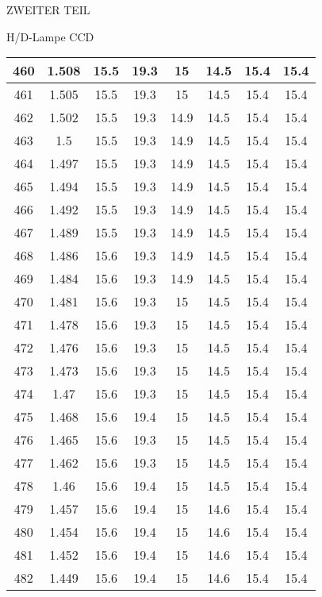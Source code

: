 \begin{appendix}
\begin{chapter}{ZWEITER TEIL}
\begin{section}{H/D-Lampe CCD}
\begin{scriptsize}
\begin{longtable}[htbp]{|c|c|c|c|c|c|c|c|}
            460 & 1.508 & 15.5 & 19.3 & 15 & 14.5 & 15.4 & 15.4 \\ \hline
            461 & 1.505 & 15.5 & 19.3 & 15 & 14.5 & 15.4 & 15.4 \\ \hline
            462 & 1.502 & 15.5 & 19.3 & 14.9 & 14.5 & 15.4 & 15.4 \\ \hline
            463 & 1.5 & 15.5 & 19.3 & 14.9 & 14.5 & 15.4 & 15.4 \\ \hline
            464 & 1.497 & 15.5 & 19.3 & 14.9 & 14.5 & 15.4 & 15.4 \\ \hline
            465 & 1.494 & 15.5 & 19.3 & 14.9 & 14.5 & 15.4 & 15.4 \\ \hline
            466 & 1.492 & 15.5 & 19.3 & 14.9 & 14.5 & 15.4 & 15.4 \\ \hline
            467 & 1.489 & 15.5 & 19.3 & 14.9 & 14.5 & 15.4 & 15.4 \\ \hline
            468 & 1.486 & 15.6 & 19.3 & 14.9 & 14.5 & 15.4 & 15.4 \\ \hline
            469 & 1.484 & 15.6 & 19.3 & 14.9 & 14.5 & 15.4 & 15.4 \\ \hline
            470 & 1.481 & 15.6 & 19.3 & 15 & 14.5 & 15.4 & 15.4 \\ \hline
            471 & 1.478 & 15.6 & 19.3 & 15 & 14.5 & 15.4 & 15.4 \\ \hline
            472 & 1.476 & 15.6 & 19.3 & 15 & 14.5 & 15.4 & 15.4 \\ \hline
            473 & 1.473 & 15.6 & 19.3 & 15 & 14.5 & 15.4 & 15.4 \\ \hline
            474 & 1.47 & 15.6 & 19.3 & 15 & 14.5 & 15.4 & 15.4 \\ \hline
            475 & 1.468 & 15.6 & 19.4 & 15 & 14.5 & 15.4 & 15.4 \\ \hline
            476 & 1.465 & 15.6 & 19.3 & 15 & 14.5 & 15.4 & 15.4 \\ \hline
            477 & 1.462 & 15.6 & 19.3 & 15 & 14.5 & 15.4 & 15.4 \\ \hline
            478 & 1.46 & 15.6 & 19.4 & 15 & 14.5 & 15.4 & 15.4 \\ \hline
            479 & 1.457 & 15.6 & 19.4 & 15 & 14.6 & 15.4 & 15.4 \\ \hline
            480 & 1.454 & 15.6 & 19.4 & 15 & 14.6 & 15.4 & 15.4 \\ \hline
            481 & 1.452 & 15.6 & 19.4 & 15 & 14.6 & 15.4 & 15.4 \\ \hline
            482 & 1.449 & 15.6 & 19.4 & 15 & 14.6 & 15.4 & 15.4 \\ \hline

\end{longtable}
\end{scriptsize}
\end{section}
\end{chapter}
\end{appendix}
